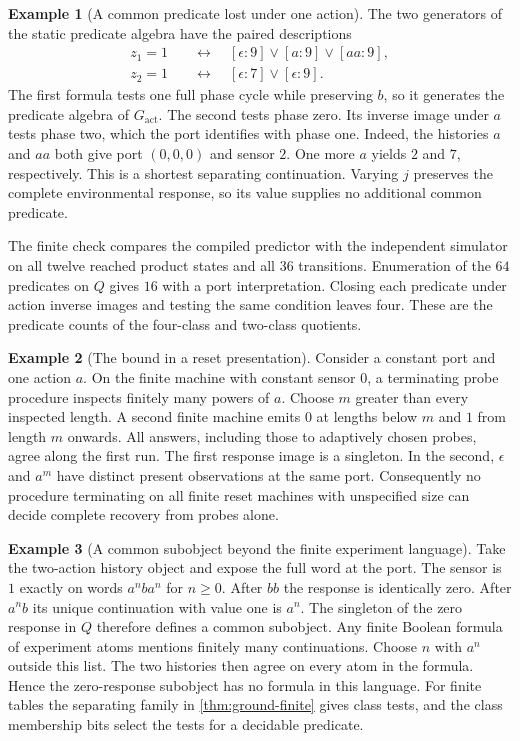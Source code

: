 \documentclass[11pt,a4paper]{article}
\theoremstyle{definition}
\newtheorem{example}[example]{Example}
\theoremstyle{remark}\newaliascnt{remark}{theorem}
\numberwithin{equation}{section}
\begin{document}
\begin{example}[A common predicate lost under one action]
The two generators of the static predicate algebra have the paired descriptions
\[
\begin{aligned}
 z_1=1 &\quad\longleftrightarrow\quad
       [\epsilon:9]\lor[a:9]\lor[aa:9],\\
 z_2=1 &\quad\longleftrightarrow\quad [\epsilon:7]\lor[\epsilon:9].
\end{aligned}
\]
The first formula tests one full phase cycle while preserving $b$, so it generates the predicate algebra of $G_{\mathrm{act}}$. The second tests phase zero. Its inverse image under $a$ tests phase two, which the port identifies with phase one. Indeed, the histories $a$ and $aa$ both give port $(0,0,0)$ and sensor $2$. One more $a$ yields $2$ and $7$, respectively. This is a shortest separating continuation. Varying $j$ preserves the complete environmental response, so its value supplies no additional common predicate.

The finite check compares the compiled predictor with the independent simulator on all twelve reached product states and all $36$ transitions. Enumeration of the $64$ predicates on $Q$ gives $16$ with a port interpretation. Closing each predicate under action inverse images and testing the same condition leaves four. These are the predicate counts of the four-class and two-class quotients.
\end{example}

\begin{example}[The bound in a reset presentation]\label{ex:ground-delayed}
Consider a constant port and one action $a$. On the finite machine with constant sensor $0$, a terminating probe procedure inspects finitely many powers of $a$. Choose $m$ greater than every inspected length. A second finite machine emits $0$ at lengths below $m$ and $1$ from length $m$ onwards. All answers, including those to adaptively chosen probes, agree along the first run. The first response image is a singleton. In the second, $\epsilon$ and $a^m$ have distinct present observations at the same port. Consequently no procedure terminating on all finite reset machines with unspecified size can decide complete recovery from probes alone.
\end{example}

\begin{example}[A common subobject beyond the finite experiment language]\label{ex:ground-infinite}
Take the two-action history object and expose the full word at the port. The sensor is $1$ exactly on words $a^nba^n$ for $n\ge0$. After $bb$ the response is identically zero. After $a^nb$ its unique continuation with value one is $a^n$. The singleton of the zero response in $Q$ therefore defines a common subobject. Any finite Boolean formula of experiment atoms mentions finitely many continuations. Choose $n$ with $a^n$ outside this list. The two histories then agree on every atom in the formula. Hence the zero-response subobject has no formula in this language. For finite tables the separating family in \cref{thm:ground-finite} gives class tests, and the class membership bits select the tests for a decidable predicate.
\end{example}
\end{document}
